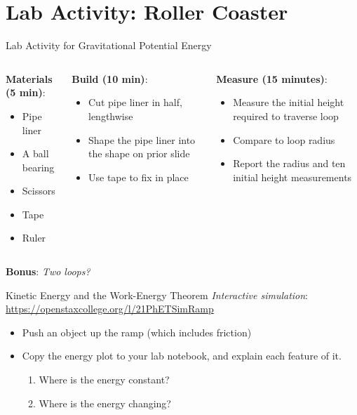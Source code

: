 \documentclass{beamer}
\begin{document}
\section{Lab Activity: Roller Coaster}

\begin{frame}{Lab Activity for Gravitational Potential Energy }
\small
\begin{columns}[T]
\begin{column}{0.33\textwidth}
\textbf{Materials (5 min)}:
\begin{itemize}
\item Pipe liner
\item A ball bearing
\item Scissors
\item Tape
\item Ruler
\end{itemize}
\end{column}
\begin{column}{0.33\textwidth}
\textbf{Build (10 min)}:
\begin{itemize}
\item Cut pipe liner in half, lengthwise
\item Shape the pipe liner into the shape on prior slide
\item Use tape to fix in place
\end{itemize}
\end{column}
\begin{column}{0.33\textwidth}
\textbf{Measure (15 minutes)}:
\begin{itemize}
\item Measure the initial height required to traverse loop
\item Compare to loop radius
\item Report the radius and ten initial height measurements
\end{itemize}
\end{column}
\end{columns}
\alert{\textbf{Bonus}: \textit{Two loops?}}
\end{frame}

\begin{frame}{Kinetic Energy and the Work-Energy Theorem}
\textit{Interactive simulation}:
\url{https://openstaxcollege.org/l/21PhETSimRamp}
\begin{itemize}
\item Push an object up the ramp (which includes friction)
\item Copy the energy plot to your lab notebook, and explain each feature of it.
\begin{enumerate}
\item Where is the energy constant?
\item Where is the energy changing?
\end{enumerate}
\end{itemize}
\end{frame}
\end{document}
